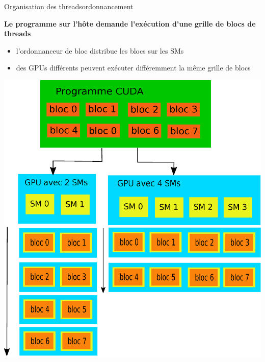 \documentclass[11pt,mathserif]{beamer}
\newcommand{\kontuz}{\faExclamationTriangle}
\begin{document}
\begin{frame}{Organisation des threads}{ordonnancement}
 \pause
 \begin{minipage}[c]{0.59\linewidth}
   {\bf Le programme sur l'hôte demande l'exécution d'une grille de blocs de threads}
  \begin{itemize}[<+->]
    \item l'ordonnanceur de bloc distribue les blocs sur les SMs
    \item[\kontuz] des GPUs différents peuvent exécuter différemment la même grille de blocs
  \end{itemize}
\end{minipage}
\begin{minipage}[c]{0.39\linewidth}
\begin{center}
  \colorbox{white}{\includegraphics[width=0.95\linewidth]{fig/bloc_ordonanceur.eps}}
\end{center}
\end{minipage}
\end{frame}
\end{document}

